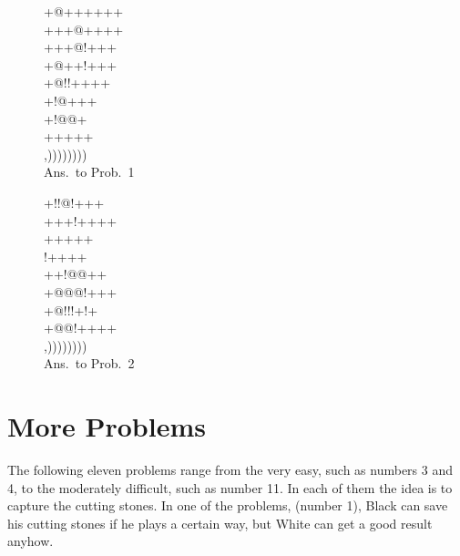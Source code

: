\documentclass[mcrownvopaper,10pt,twopage,onecolumn,final]{memoir}
\begin{document}
\begin{figure}[ht]
    \begin{minipage}[c]{0.5\linewidth}
        \centering    
        {\gnos%
        +@++++++\\
        +++@++++\\
        +++@!+++\\
        +@++!+++\\
        +@!!++++\\
        +!@{\gnosw{}}{\gnosb{}}+++\\
        +!@{\gnosw{}}{\gnosb{}}@+\\
        ++{\gnosw{}}{\gnosb{}}+++\\
        ,))))))))\\
        }
        Ans.\ to Prob.\ 1
    \end{minipage}%
    \begin{minipage}[c]{0.5\linewidth}
        \centering    
        {\gnos%
        +!!@!+++\\
        +++!++++\\
        +++++\\
        !{\gnosb{}}++++\\
        ++{\gnosw{}}!@@++\\
        +@@@!+++\\
        +@!!!+!+\\
        +@@!++++\\
        ,))))))))\\
        }
        Ans.\ to Prob.\ 2
    \end{minipage}
\end{figure}

\section{More Problems}
The following eleven problems range from the very easy, such as
numbers 3 and 4, to the moderately difficult, such as number 11. In each
of them the idea is to capture the cutting stones. In one of the problems,
(number 1), Black can save his cutting stones if he plays a certain way,
but White can get a good result anyhow.
\end{document}
